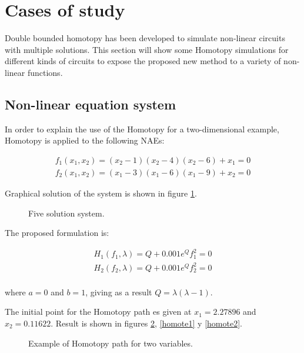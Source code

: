 \documentclass[conference,letterpaper,onecolumn]{IEEEtran}
\begin{document}
\section{Cases of study}

Double bounded homotopy has been developed to simulate non-linear circuits with multiple solutions. This section will show some Homotopy simulations for different kinds of circuits to expose the proposed new method to a variety of non-linear functions.

\subsection{Non-linear equation system}

In order to explain the use of the Homotopy for a two-dimensional example, Homotopy is applied to the following NAEs:

\begin{displaymath}
\begin{array}{c}
f_1(x_1,x_2)=(x_2-1)(x_2-4)(x_2-6)+x_1=0\\
f_2(x_1,x_2)=(x_1-3)(x_1-6)(x_1-9)+x_2=0
\end{array}
\end{displaymath}

Graphical solution of the system is shown in figure \ref{9sol}.

\begin{figure}[hbtp]
\centerline{
\epsfxsize=80mm
}
\caption{Five solution system.}
\label{9sol}
\end{figure}

The proposed formulation is:

\begin{displaymath}
\begin{array}{c}
H_1(f_1,\lambda)=Q+0.001e^{Q}f_1^2=0\\
H_2(f_2,\lambda)=Q+0.001e^{Q}f_2^2=0\\
\end{array}
\end{displaymath}

where $a=0$ and $b=1$, giving as a result $Q=\lambda(\lambda-1)$.

The initial point for the Homotopy path es given at $x_1 = 2.27896$ and  $x_2 = 0.11622$. Result is shown in figures \ref{homote}, \ref{homote1} y \ref{homote2}.

\begin{figure}[hbtp]
\centerline{
\epsfxsize=80mm
}
\caption{Example of Homotopy path for two variables.}
\label{homote}
\end{figure}
\end{document}
